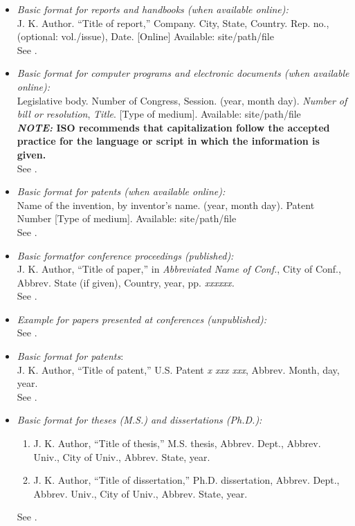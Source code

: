 \documentclass[twoside,web]{ieeecolor}
\begin{document}
\begin{itemize}
\item \emph{Basic format for reports and handbooks (when available online):}\\
J. K. Author. ``Title of report,'' Company. City, State, Country. Rep. no., (optional: vol./issue), Date. [Online] Available: site/path/file\\
See \cite{b18,b19}.

\item \emph{Basic format for computer programs and electronic documents (when available online): }\\
Legislative body. Number of Congress, Session. (year, month day). \emph{Number of bill or resolution}, \emph{Title}. [Type of medium]. Available: site/path/file\\
\textbf{\emph{NOTE: }ISO recommends that capitalization follow the accepted practice for the language or script in which the information is given.}\\
See \cite{b20}.

\item \emph{Basic format for patents (when available online):}\\
Name of the invention, by inventor's name. (year, month day). Patent Number [Type of medium]. Available: site/path/file\\
See \cite{b21}.

\item \emph{Basic format}\emph{for conference proceedings (published):}\\
J. K. Author, ``Title of paper,'' in \emph{Abbreviated Name of Conf.}, City of Conf., Abbrev. State (if given), Country, year, pp. \emph{xxxxxx.}\\
See \cite{b22}.

\item \emph{Example for papers presented at conferences (unpublished):}\\
See \cite{b23}.

\item \emph{Basic format for patents}$:$\\
J. K. Author, ``Title of patent,'' U.S. Patent \emph{x xxx xxx}, Abbrev. Month, day, year.\\
See \cite{b24}.

\item \emph{Basic format for theses (M.S.) and dissertations (Ph.D.):}
\begin{enumerate}
\item J. K. Author, ``Title of thesis,'' M.S. thesis, Abbrev. Dept., Abbrev. Univ., City of Univ., Abbrev. State, year.
\item J. K. Author, ``Title of dissertation,'' Ph.D. dissertation, Abbrev. Dept., Abbrev. Univ., City of Univ., Abbrev. State, year.
\end{enumerate}
See \cite{b25,b26}.


\end{itemize}
\end{document}

